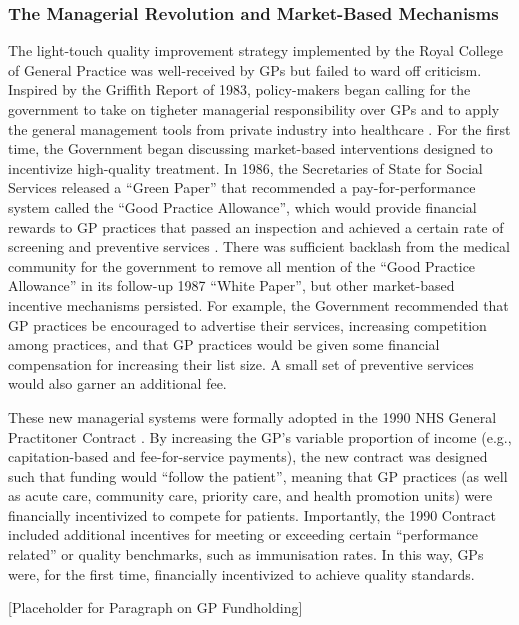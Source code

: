 \documentclass[12pt]{article}
\begin{document}
\subsubsection{The Managerial Revolution and Market-Based Mechanisms}

The light-touch quality improvement strategy implemented by the Royal College of General Practice was well-received by GPs \citep{bakerQualityInitiativeRoyal1989} but failed to ward off criticism. Inspired by the Griffith Report of 1983, policy-makers began calling for the government to take on tigheter managerial responsibility over GPs and to apply the general management tools from private industry into healthcare \citep{strongNHSNewManagement1990}. For the first time, the Government began discussing market-based interventions designed to incentivize high-quality treatment. In 1986, the Secretaries of State for Social Services released a ``Green Paper'' that recommended a pay-for-performance system called the ``Good Practice Allowance'', which would provide financial rewards to GP practices that passed an inspection and achieved a certain rate of screening and preventive services \citep{bakerQualityInitiativeRoyal1989}. There was sufficient backlash from the medical community for the government to remove all mention of the ``Good Practice Allowance'' in its follow-up 1987 ``White Paper'', but other market-based incentive mechanisms persisted. For example, the Government recommended that GP practices be encouraged to advertise their services, increasing competition among practices, and that GP practices would be given some financial compensation for increasing their list size. A small set of preventive services would also garner an additional fee.

These new managerial systems were formally adopted in the 1990 NHS General Practitoner Contract \citep{williamsAllChangeNHS1993}. By increasing the GP's variable proportion of income (e.g., capitation-based and fee-for-service payments), the new contract was designed such that funding would ``follow the patient'', meaning that GP practices (as well as acute care, community care, priority care, and health promotion units) were financially incentivized to compete for patients. Importantly, the 1990 Contract included additional incentives for meeting or exceeding certain ``performance related'' or quality benchmarks, such as immunisation rates. In this way, GPs were, for the first time, financially incentivized to achieve quality standards.

[Placeholder for Paragraph on GP Fundholding]
\end{document}

